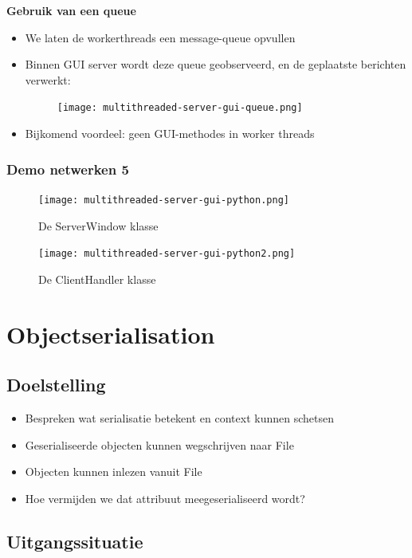 \documentclass{article}
\begin{document}
\textbf{Gebruik van een queue}

\begin{itemize}
    \item We laten de workerthreads een message-queue opvullen
    \item Binnen GUI server wordt deze queue geobserveerd, en de geplaatste berichten verwerkt:
    \begin{figure}[H]
        \centering
        \texttt{[image: multithreaded-server-gui-queue.png]}
    \end{figure}
    \item Bijkomend voordeel: geen GUI-methodes in worker threads
\end{itemize}

\subsubsection{Demo netwerken 5}

\begin{figure}[H]
    \centering
    \texttt{[image: multithreaded-server-gui-python.png]}
    \caption{De ServerWindow klasse}
\end{figure}

\begin{figure}[H]
    \centering
    \texttt{[image: multithreaded-server-gui-python2.png]}
    \caption{De ClientHandler klasse}
\end{figure}

\section{Objectserialisation}

\subsection{Doelstelling}

\begin{itemize}
    \item Bespreken wat serialisatie betekent en context kunnen schetsen
    \item Geserialiseerde objecten kunnen wegschrijven naar File
    \item Objecten kunnen inlezen vanuit File
    \item Hoe vermijden we dat attribuut meegeserialiseerd wordt?
\end{itemize}

\subsection{Uitgangssituatie}
\end{document}

